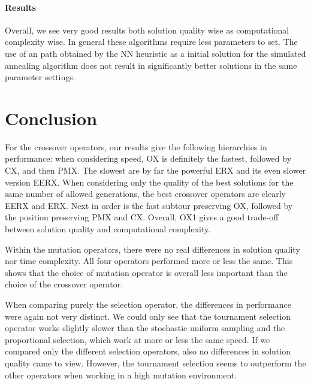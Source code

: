 \documentclass[a4paper,english,11pt,]{scrartcl}
\begin{document}
\paragraph{Results}
Overall, we see very good results both solution quality wise as computational complexity wise. In general these algorithms require less parameters to set. The use of an path obtained by the NN heuristic as a initial solution for the simulated annealing algorithm does not result in significantly better solutions in the same parameter settings.

\clearpage
\section{Conclusion}
For the crossover operators, our results give the following hierarchies in performance: when considering speed, OX is definitely the fastest, followed by CX, and then PMX. The slowest are by far the powerful ERX and its even slower version EERX. 
When considering only the quality of the best solutions for the same number of allowed generations, the best crossover operators are clearly EERX and ERX. Next in order is the fast subtour preserving OX, followed by the position preserving PMX and CX. 
Overall, OX1 gives a good trade-off between solution quality and computational complexity.

Within the mutation operators, there were no real differences in solution quality nor time complexity. 
All four operators performed more or less the same. This shows that the choice of mutation operator is overall less important than the choice of the crossover operator.

When comparing purely the selection operator, the differences in performance were again not very distinct. We could only see that the tournament selection operator works slightly slower than the stochastic uniform sampling and the proportional selection, which work at more or less the same speed. If we compared only the different selection operators, also no differences in solution quality came to view. However, the tournament selection seems to outperform the other operators when working in a high mutation environment. 
\end{document}
